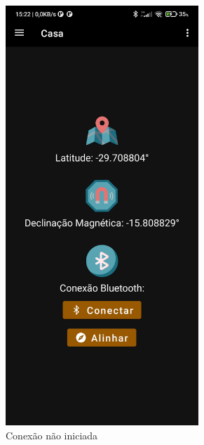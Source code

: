 \begin{figure}[!htb]
	\centering
	\caption{Conexão Realizada}
	\label{conect}
	\begin{subfigure}[b]{0.3\textwidth}
		\centering
		\includegraphics[width=0.8\textwidth]{figuras/desAplicativo/conectar}
		\caption{Conexão não iniciada}
	\end{subfigure}
	\hfill
	\begin{subfigure}[b]{0.3\textwidth}
		\centering

\end{subfigure}
\end{figure}
